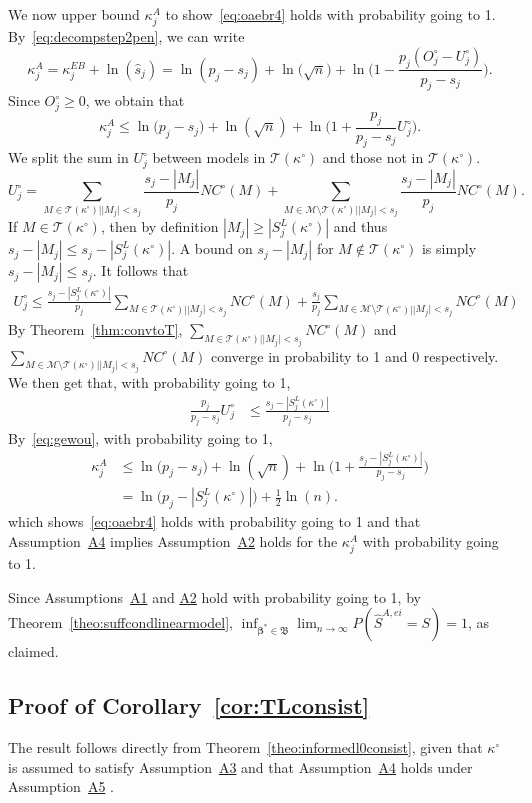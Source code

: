 \documentclass[
  12pt]{article}
\newcommand{\M}{\mathcal{M}}
\newcommand{\T}{\mathcal{T}}
\newcommand{\bbeta}{\boldsymbol{\beta}}
\newcommand{\bB}{\mathfrak{B}}
\begin{document}
We now upper bound $\kappa^{A}_j$ to show~\eqref{eq:oaebr4} holds with probability going to 1. By~\eqref{eq:decompstep2pen}, we can write
    $$\kappa_j^{A}=\kappa_j^{EB}+\ln(\widehat s_j)= \ln(p_j-s_j)+\ln\big(\sqrt{n}\big)+\ln\Big(1-\frac{p_j(O^{\circ}_j-U^{\circ}_j)}{p_j-s_j}\Big).$$
Since $O_j^{\circ} \geq 0$, we obtain that 
\begin{equation*}
    \kappa^{A}_j \leq \ln\big(p_j-s_j\big)+\ln(\sqrt{n})+\ln\bigg(1+\frac{p_j}{p_j-s_j}U^{\circ}_j\bigg).
\end{equation*}
We split the sum in $U^{\circ}_j$ between models in $\T(\kappa^{\circ})$ and those not in $\T(\kappa^{\circ})$. 
$$U_j^{\circ} = \sum_{M \in \T(\kappa^{\circ}) | |M_j| < s_j}\frac{s_j-|M_j|}{p_j}NC^{\circ}(M)+\sum_{M \in \M\setminus\T(\kappa^{\circ}) | |M_j| < s_j}\frac{s_j-|M_j|}{p_j}NC^{\circ}(M).
$$
If $M\in \T(\kappa^{\circ})$, then by definition $|M_j|\geq |S^{L}_j(\kappa^{\circ})|$ and thus $s_j-|M_j|\leq s_j-|S^{L}_j(\kappa^{\circ})|$. A bound on $s_j-|M_j|$ for $M\not\in \T(\kappa^{\circ})$ is simply $s_j-|M_j|\leq s_j$. It follows that
\begin{eqnarray*}
    U^{\circ}_j \leq \frac{s_j-|S^{L}_j(\kappa^{\circ})|}{p_j}\sum_{M \in \T(\kappa^{\circ}) | |M_j| < s_j}NC^{\circ}(M)+  \frac{s_j}{p_j}\sum_{M \in \M \setminus \T(\kappa^{\circ})| |M_j| < s_j}NC^{\circ}(M)
\end{eqnarray*}
By Theorem~\ref{thm:convtoT}, $\sum_{M \in  \T(\kappa^{\circ})| |M_j| < s_j}NC^{\circ}(M)$ and $\sum_{M \in \M \setminus \T(\kappa^{\circ})| |M_j| < s_j}NC^{\circ}(M)$ converge in probability to 1 and 0 respectively. We then get that, with probability going to 1,
\begin{align}
    \frac{p_j}{p_j-s_j}U^{\circ}_j &\leq \frac{s_j-|S^{L}_j(\kappa^{\circ})|}{p_j-s_j} \label{eq:gewou}
\end{align}
By~\eqref{eq:gewou}, with probability going to 1,
\begin{align}\label{eq:finalupperboundkappaj2}
    \kappa_j^A &\leq  \ln\big(p_j-s_j\big)+\ln(\sqrt{n})+\ln\bigg(1+\frac{s_j-|S^{L}_j(\kappa^{\circ})|}{p_j-s_j}\bigg)\nonumber\\
    &= \ln\big(p_j-|S^{L}_j(\kappa^{\circ})|\big)+\frac{1}{2}\ln(n).
\end{align}
which shows~\eqref{eq:oaebr4} holds with probability going to 1 and that
Assumption~\hyperlink{lab:A4}{A4} implies Assumption~\hyperlink{lab:A2}{A2} holds for the $\kappa^{A}_j$ with probability going to 1. 

Since Assumptions~\hyperlink{lab:A1}{A1} and \hyperlink{lab:A2}{A2} hold with probability going to 1, by Theorem~\ref{theo:suffcondlinearmodel}, $\inf_{\bbeta^*\in\bB}\lim_{n\to\infty}P(\hat{S}^{A,ei}= S)= 1$, as claimed.

\subsection{Proof of Corollary~\ref{cor:TLconsist}}

The result follows directly from Theorem~\ref{theo:informedl0consist}, given that $\kappa^{\circ}$ is assumed to satisfy Assumption~\hyperlink{lab:A3}{A3} and that
Assumption~\hyperlink{lab:A4}{A4} holds under Assumption~\hyperlink{lab:A5}{A5} .
\end{document}
